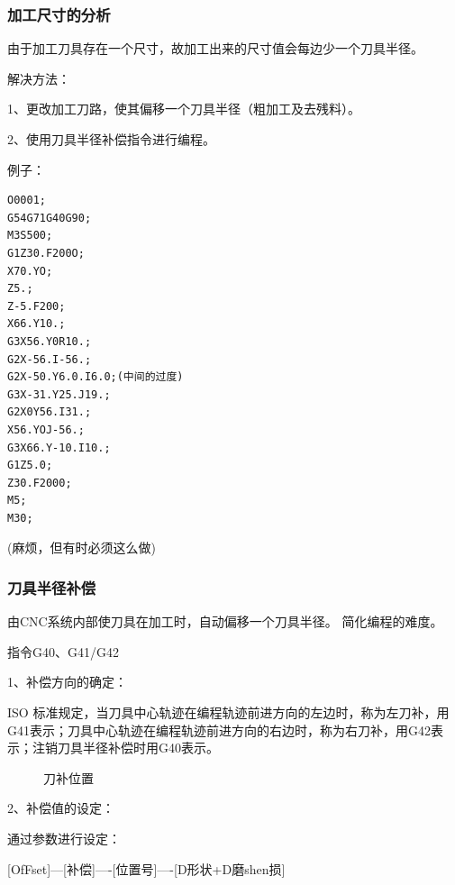 \subsubsection{加工尺寸的分析}

由于加工刀具存在一个尺寸，故加工出来的尺寸值会每边少一个刀具半径。

解决方法：

1、更改加工刀路，使其偏移一个刀具半径（粗加工及去残料）。

2、使用刀具半径补偿指令进行编程。

例子：

\begin{lstlisting}
O0001;
G54G71G40G90;
M3S500;
G1Z30.F200O;
X70.YO;
Z5.;
Z-5.F200;
X66.Y10.;
G3X56.Y0R10.;
G2X-56.I-56.;
G2X-50.Y6.0.I6.0;(中间的过度)
G3X-31.Y25.J19.;
G2X0Y56.I31.;
X56.YOJ-56.;
G3X66.Y-10.I10.;
G1Z5.0;
Z30.F2000;
M5;
M30;
\end{lstlisting}
(麻烦，但有时必须这么做)


\subsubsection{刀具半径补偿}

由CNC系统内部使刀具在加工时，自动偏移一个刀具半径。
简化编程的难度。

指令G40、G41/G42

1、补偿方向的确定：

ISO 标准规定，当刀具中心轨迹在编程轨迹前进方向的左边时，称为左刀补，用G41表示；刀具中心轨迹在编程轨迹前进方向的右边时，称为右刀补，用G42表示；注销刀具半径补偿时用G40表示。

\begin{figure}[h]
	\centering
    

\caption{刀补位置}
\label{fig:7-5}
\end{figure}

2、补偿值的设定：

通过参数进行设定：

[OfFset]---[补偿]----[位置号]----[D形状+D磨shen损]

